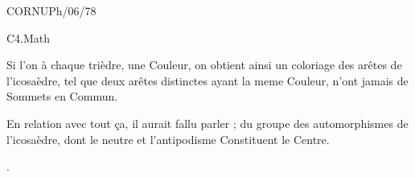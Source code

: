 
CORNU\qquad Ph/06/78

C4.Math


Si l'on  à chaque trièdre, une Couleur, on obtient ainsi un coloriage des arêtes de l'icosaèdre, tel que deux arêtes distinctes ayant la meme Couleur,  n'ont jamais de Sommets en Commun.

En relation avec tout ça, il aurait fallu parler ; du groupe des automorphismes de l'icosaèdre, dont le neutre et l'antipodisme Constituent le Centre.


\begin{center}
\uline{}.
\end{center}

